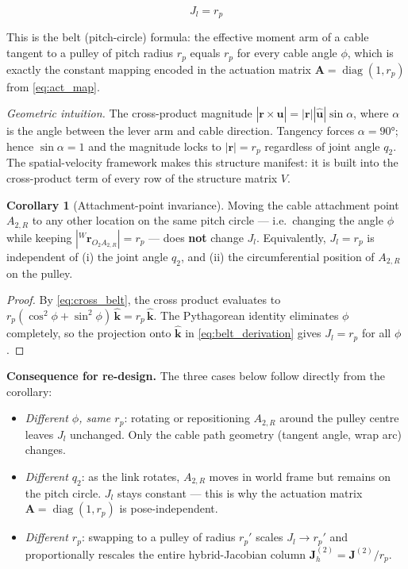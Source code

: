 \documentclass[12pt, a4paper]{article}
\theoremstyle{definition}
\newtheorem{corollary}{Corollary}[section]
\newcommand{\bJ}{\bm{J}}
\newcommand{\bA}{\bm{A}}
\begin{document}
\begin{equation}
  \label{eq:belt_final}
  \boxed{J_l = r_p}
\end{equation}

This is the belt (pitch-circle) formula: the effective moment arm of a cable
tangent to a pulley of pitch radius $r_p$ equals $r_p$ for every cable angle
$\phi$, which is exactly the constant mapping encoded in the actuation matrix
$\bA = \operatorname{diag}(1, r_p)$ from \cref{eq:act_map}.

\medskip\noindent
\textit{Geometric intuition.}
The cross-product magnitude $|\mathbf{r}\times\hat{\mathbf{u}}| = |\mathbf{r}||\hat{\mathbf{u}}|\sin\alpha$,
where $\alpha$ is the angle between the lever arm and cable direction.
Tangency forces $\alpha = 90°$; hence $\sin\alpha = 1$ and the magnitude locks
to $|\mathbf{r}| = r_p$ regardless of joint angle $q_2$.  The spatial-velocity
framework makes this structure manifest: it is built into the cross-product term
of every row of the structure matrix $V$.

\begin{mdframed}
\begin{corollary}[Attachment-point invariance]
\label{cor:attachment_invariance}
Moving the cable attachment point $A_{2,R}$ to any other location on the
same pitch circle — i.e.\ changing the angle $\phi$ while keeping
$|{}^W\mathbf{r}_{O_2 A_{2,R}}| = r_p$ — does \textbf{not} change $J_l$.
Equivalently, $J_l = r_p$ is independent of
(i) the joint angle $q_2$, and
(ii) the circumferential position of $A_{2,R}$ on the pulley.
\end{corollary}
\end{mdframed}

\begin{proof}
By \cref{eq:cross_belt}, the cross product evaluates to
$r_p(\cos^2\phi + \sin^2\phi)\,\hat{\mathbf{k}} = r_p\,\hat{\mathbf{k}}$.
The Pythagorean identity eliminates $\phi$ completely, so the projection
onto $\hat{\mathbf{k}}$ in \cref{eq:belt_derivation} gives $J_l = r_p$
for all $\phi$.
\end{proof}

\noindent
\textbf{Consequence for re-design.}
The three cases below follow directly from the corollary:
\begin{itemize}[leftmargin=2em, topsep=2pt, itemsep=2pt]
  \item \emph{Different $\phi$, same $r_p$}: rotating or repositioning $A_{2,R}$ around the
        pulley centre leaves $J_l$ unchanged.  Only the cable path geometry
        (tangent angle, wrap arc) changes.
  \item \emph{Different $q_2$}: as the link rotates, $A_{2,R}$ moves in world
        frame but remains on the pitch circle.  $J_l$ stays constant — this
        is why the actuation matrix $\bA = \operatorname{diag}(1,r_p)$ is
        pose-independent.
  \item \emph{Different $r_p$}: swapping to a pulley of radius $r_p'$ scales
        $J_l \to r_p'$ and proportionally rescales the entire hybrid-Jacobian
        column $\bJ_h^{(2)} = \bJ^{(2)}/r_p$.
\end{itemize}
\end{document}

